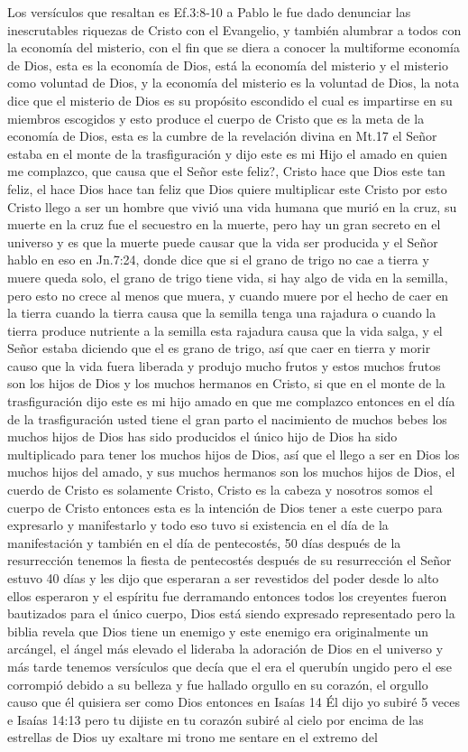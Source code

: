 \documentclass[12pt]{article}
\begin{document}
Los versículos que resaltan es Ef.3:8-10 a Pablo le fue dado denunciar las inescrutables riquezas de Cristo con el Evangelio, y también alumbrar a todos con la economía del misterio, con el fin que se diera a conocer la multiforme economía de Dios, esta es la economía de Dios, está la economía del misterio y el misterio como voluntad de Dios, y la economía del misterio es la voluntad de Dios, la nota dice que el misterio de Dios es su propósito escondido el cual es impartirse en su miembros escogidos y esto produce el cuerpo de Cristo que es la meta de la economía de Dios, esta es la cumbre de la revelación divina en Mt.17 el Señor estaba en el monte de la trasfiguración y dijo este es mi Hijo el amado en quien me complazco, que causa que el Señor este feliz?, Cristo hace que Dios este tan feliz, el hace Dios hace tan feliz que Dios quiere multiplicar este Cristo por esto Cristo llego a ser un hombre que vivió una vida humana que murió en la cruz, su muerte en la cruz fue el secuestro en la muerte, pero hay un gran secreto en el universo y es que la muerte puede causar que la vida ser producida y el Señor hablo en eso en Jn.7:24, donde dice que si el grano de trigo no cae a tierra y muere queda solo, el grano de trigo tiene vida, si hay algo de vida en la semilla, pero esto no crece al menos que muera, y cuando muere por el hecho de caer en la tierra cuando la tierra causa que la semilla tenga una rajadura o cuando la tierra produce nutriente a la semilla esta rajadura causa que la vida salga, y el Señor estaba diciendo que el es grano de trigo, así que caer en tierra y morir  causo que la vida fuera liberada y produjo mucho frutos y estos muchos frutos son los hijos de Dios y los muchos hermanos en Cristo, si que en el monte  de la trasfiguración dijo este es mi hijo amado en que me complazco entonces en el día de la trasfiguración usted tiene el gran parto  el nacimiento de muchos bebes los muchos hijos de Dios has sido producidos el único hijo de Dios ha sido multiplicado para tener los muchos hijos de Dios, así que el llego a ser en Dios los muchos hijos del  amado, y sus muchos hermanos son los muchos hijos de Dios, el cuerdo de Cristo es solamente Cristo, Cristo es la cabeza y nosotros somos el cuerpo de Cristo entonces esta es la intención de Dios tener a este cuerpo para expresarlo y manifestarlo y todo eso tuvo si existencia en el día de la manifestación y también en el día de pentecostés, 50 días después de la resurrección tenemos la fiesta de pentecostés después de su resurrección el Señor estuvo 40 días y les dijo que esperaran a ser revestidos del poder desde lo alto ellos esperaron y el espíritu fue derramando entonces todos los creyentes fueron bautizados para el único cuerpo, Dios está siendo expresado representado pero la biblia revela que Dios tiene un enemigo y este enemigo era originalmente un arcángel, el ángel más elevado el lideraba la adoración de Dios en el universo y más tarde tenemos versículos que decía que el era el querubín ungido pero el ese corrompió debido a su belleza y fue hallado orgullo en su corazón, el orgullo causo que él quisiera ser como Dios entonces en Isaías 14 Él dijo yo subiré 5 veces e Isaías 14:13 pero tu dijiste en tu corazón subiré al cielo por encima de las estrellas de Dios uy exaltare mi trono me sentare en el extremo del 
\end{document}
